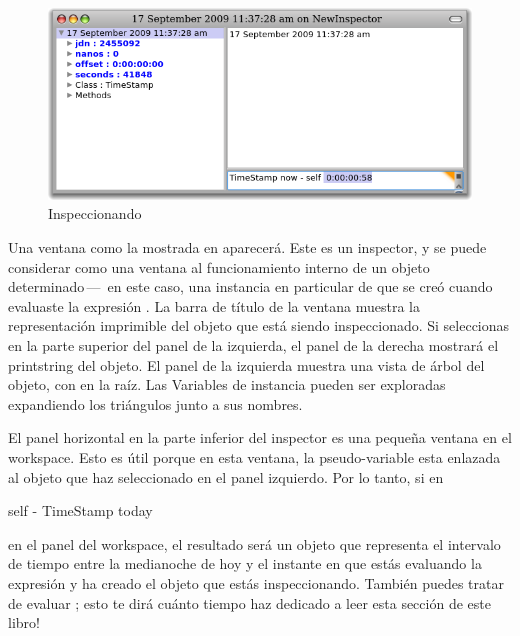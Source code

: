 \documentclass[spanish,a4paper,10pt,twoside]{book}
\begin{document}
\begin{figure}[btp]
	\begin{center}
		\includegraphics[width=\textwidth]{inspectTimeNow1}
	\end{center}
	\caption{Inspeccionando }
\end{figure}

Una ventana como la mostrada en  aparecer\'a.
Este es un inspector, y se puede considerar como una ventana al funcionamiento interno de un objeto determinado\,---\, en este caso, una instancia en particular de \mbox{}
que se cre\'o cuando evaluaste la expresi\'on .
La barra de t\'itulo de la ventana muestra la representaci\'on imprimible del objeto que est\'a siendo inspeccionado.
Si seleccionas  en la parte superior del panel de la izquierda, el panel de la derecha mostrar\'a el printstring del objeto.
El panel de la izquierda muestra una vista de \'arbol del objeto, con \self en la ra\'iz.
Las Variables de instancia pueden ser exploradas expandiendo los tri\'angulos junto a sus nombres.

El panel horizontal en la parte inferior del inspector es una peque\~na ventana en el workspace.  Esto es \'util porque en esta ventana, la pseudo-variable  esta enlazada al objeto que haz seleccionado en el panel izquierdo.
Por lo tanto, si  en
\begin{code}{}
self - TimeStamp today
\end{code}
en el panel del workspace, el resultado ser\'a un objeto  que representa el intervalo de tiempo entre la medianoche de hoy y el instante en que est\'as evaluando la expresi\'on   y ha creado el objeto  que est\'as inspeccionando.
Tambi\'en puedes tratar de evaluar ; esto te dir\'a cu\'anto tiempo haz dedicado a leer esta secci\'on de este libro!
\end{document}

